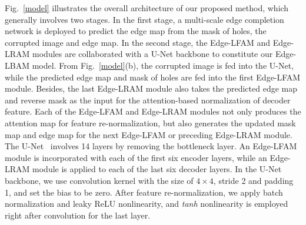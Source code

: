 \documentclass[10pt,journal,compsoc]{IEEEtran}
\begin{document}
Fig.~\ref{model} illustrates the overall architecture of our proposed method, which generally involves two stages.
%
In the first stage, a multi-scale edge completion network is deployed to predict the edge map from the mask of holes, the corrupted image and edge map.
%
In the second stage, the Edge-LFAM and Edge-LRAM modules are collaborated with a U-Net backbone to constitute our Edge-LBAM model.
%
From Fig.~\ref{model}(b), the corrupted image is fed into the U-Net, while the predicted edge map and mask of holes are fed into the first Edge-LFAM module.
%
Besides, the last Edge-LRAM module also takes the predicted edge map and reverse mask as the input for the attention-based normalization of decoder feature.
%
Each of the Edge-LFAM and Edge-LRAM modules not only produces the attention map for feature re-normalization, but also generates the updated mask map and edge map for the next Edge-LFAM or preceding Edge-LRAM module.
%
%
%
%
The U-Net~\cite{UNetRFB15a} involves 14 layers by removing the bottleneck layer.
%
An Edge-LFAM module is incorporated with each of the first six encoder layers, while an Edge-LRAM module is applied to each of the last six decoder layers.
%
In the U-Net backbone, we use convolution kernel with the size of $4\times4$, stride 2 and padding 1, and set the bias to be zero.
%
After feature re-normalization, we apply batch normalization and leaky ReLU nonlinearity, and \emph{tanh} nonlinearity is employed right after convolution for the last layer.


%
%
\end{document}
